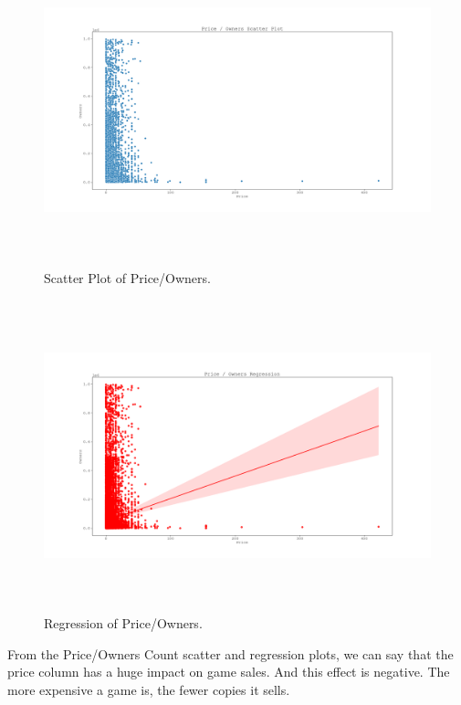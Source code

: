 \documentclass[conference]{IEEEtran}
\begin{document}
\begin{figure}[h]
  \includegraphics[width=\linewidth, height=9cm]{assets-2/price_owners_scatter.png}
  \caption{Scatter Plot of Price/Owners.}
  \label{fig:price_owners1}
\end{figure}
\FloatBarrier

\begin{figure}[h]
  \includegraphics[width=\linewidth, height=9cm]{assets-2/price_owners_regression.png}
  \caption{Regression of Price/Owners.}
  \label{fig:price_owners2}
\end{figure}
\FloatBarrier

From the Price/Owners Count scatter and regression plots, we can say that the price column has a huge impact on game sales. And this effect is negative. The more expensive a game is, the fewer copies it sells. \\\\\\
\end{document}
